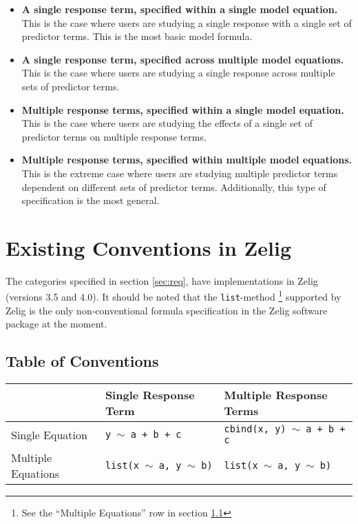 \documentclass{article}
\newcommand{\tweedly}[0]{$\sim${ }}
\begin{document}
\begin{itemize}

  \item {\bf A single response term, specified within a single model equation.}
    This is the case where users are studying a single response with a single
    set of predictor terms. This is the most basic model formula.

  \item {\bf A single response term, specified across multiple model equations.}
    This is the case where users are studying a single response across multiple
    sets of predictor terms.

  \item {\bf Multiple response terms, specified within a single model equation.}
    This is the case where users are studying the effects of a single set of
    predictor terms on multiple response terms.

  \item {\bf Multiple response terms, specified within multiple model equations.}
    This is the extreme case where users are studying multiple predictor terms
    dependent on different sets of predictor terms. Additionally, this type of
    specification is the most general.

\end{itemize}



%
%
%
\section{Existing Conventions in Zelig}
\label{sec:existing-zelig}

The categories specified in section \ref{sec:req}, have implementations in
Zelig (versions 3.5 and 4.0). It should be noted that the {\tt list}-method
\footnote{See the ``Multiple Equations'' row in section
\ref{subsec:table-conventions}} supported by Zelig is the only non-conventional
formula specification in the Zelig software package at the moment.


\subsection{Table of Conventions}
\label{subsec:table-conventions}

{\noindent}\begin{tabular}{|l|l|l|}

  \hline

  & Single Response Term & Multiple Response Terms \\ \hline

  Single Equation &
  {\tt y \tweedly a + b + c} & {\tt cbind(x, y) \tweedly a + b + c}
  \\ \hline

  Multiple Equations & 
  {\tt list(x \tweedly a, y \tweedly b)} &
  {\tt list(x \tweedly a, y \tweedly b)} \\ \hline


\end{tabular}
\end{document}
